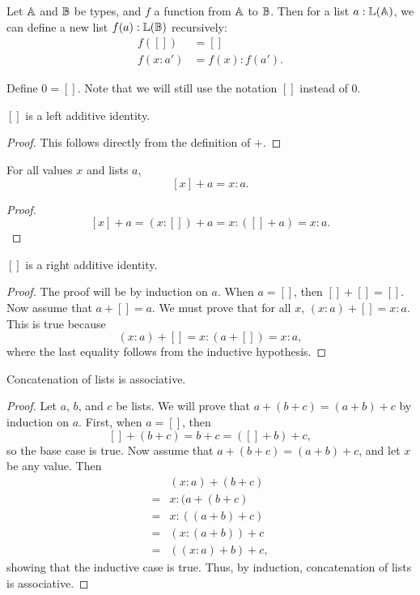 \documentclass[../math.tex]{subfiles}
\begin{document}
\begin{definition}
    Let $\mathbb{A}$ and $\mathbb{B}$ be types, and $f$ a function from $\mathbb{A}$ to $\mathbb{B}$.  Then for
    a list $a : \mathbb{L}(\mathbb{A})$, we can define a new list $f(a) : \mathbb{L}(\mathbb{B})$ recursively:
    \begin{align*}
            f([]) &= [] \\
        f(x : a') &= f(x) : f(a').
    \end{align*}
\end{definition}

\begin{instance}
    Define $0 = []$.  Note that we will still use the notation $[]$ instead of
    $0$.
\end{instance}

\begin{instance}
    $[]$ is a left additive identity.
\end{instance}
\begin{proof}
    This follows directly from the definition of $+$.
\end{proof}

\begin{theorem}
    For all values $x$ and lists $a$,
    \[
        [x] + a = x : a.
    \]
\end{theorem}
\begin{proof}
    \[
        [x] + a = (x : []) + a = x : ([] + a) = x : a.
    \]
\end{proof}

\begin{instance}
    $[]$ is a right additive identity.
\end{instance}
\begin{proof}
    The proof will be by induction on $a$.  When $a = []$, then $[] + [] = []$.
    Now assume that $a + [] = a$.  We must prove that for all $x$, $(x : a) + []
    = x : a$.  This is true because
    \[
        (x : a) + [] = x : (a + []) = x : a,
    \]
    where the last equality follows from the inductive hypothesis.
\end{proof}

\begin{instance}
    Concatenation of lists is associative.
\end{instance}
\begin{proof}
    Let $a$, $b$, and $c$ be lists.  We will prove that $a + (b + c) =
    (a + b) + c$ by induction on $a$.  First, when $a = []$, then
    \[
        [] + (b + c) = b + c = ([] + b) + c,
    \]
    so the base case is true.  Now assume that $a + (b + c) = (a +
    b) + c$, and let $x$ be any value.  Then
    \begin{align*}
        &(x : a) + (b + c) \\
        ={}& x : (a + (b + c) \\
        ={}& x : ((a + b) + c) \\
        ={}& (x : (a + b)) + c \\
        ={}& ((x : a) + b) + c,
    \end{align*}
    showing that the inductive case is true.  Thus, by induction, concatenation
    of lists is associative.
\end{proof}
\end{document}

